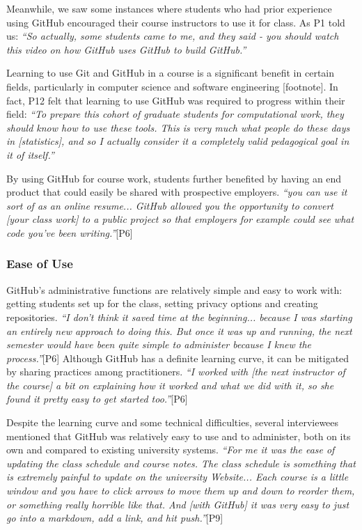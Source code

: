 Meanwhile, we saw some instances where students who had prior experience using GitHub encouraged their course instructors to use it for class. As P1 told us: \textit{``So actually, some students came to me, and they said - you should watch this video on how GitHub uses GitHub to build GitHub.''}

Learning to use Git and GitHub in a course is a significant benefit in certain fields, particularly in computer science and software engineering [footnote]. In fact, P12 felt that learning to use GitHub was required to progress within their field: \textit{``To prepare this cohort of graduate students for computational work, they should know how to use these tools. This is very much what people do these days in [statistics], and so I actually consider it a completely valid pedagogical goal in it of itself.''}

By using GitHub for course work, students further benefited by having an end product that could easily be shared with prospective employers. \textit{``you can use it sort of as an online resume... GitHub allowed you the opportunity to convert [your class work] to a public project so that employers for example could see what code you've been writing.''}[P6]

\subsubsection{Ease of Use}
GitHub's administrative functions are relatively simple and easy to work with: getting students set up for the class, setting privacy options and creating repositories. \textit{``I don't think it saved time at the beginning... because I was starting an entirely new approach to doing this. But once it was up and running, the next semester would have been quite simple to administer because I knew the process.''}[P6] Although GitHub has a definite learning curve, it can be mitigated by sharing practices among practitioners. \textit{``I worked with [the next instructor of the course] a bit on explaining how it worked and what we did with it, so she found it pretty easy to get started too.''}[P6]

Despite the learning curve and some technical difficulties, several interviewees mentioned that GitHub was relatively easy to use and to administer, both on its own and compared to existing university systems. \textit{``For me it was the ease of updating the class schedule and course notes. The class schedule is something that is extremely painful to update on the university Website... Each course is a little window and you have to click arrows to move them up and down to reorder them, or something really horrible like that. And [with GitHub] it was very easy to just go into a markdown, add a link, and hit push.''}[P9]

